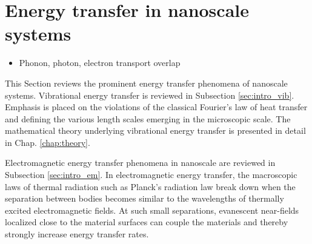 




\section{Energy transfer in nanoscale systems}
\begin{itemize}
 \item Phonon, photon, electron transport overlap
\end{itemize}
This Section reviews the prominent energy transfer phenomena of nanoscale systems. Vibrational energy transfer is reviewed in Subsection \ref{sec:intro_vib}. Emphasis is placed on the violations of the classical Fourier's law of heat transfer and defining the various length scales emerging in the microscopic scale. The mathematical theory underlying vibrational energy transfer is presented in detail in Chap. \ref{chap:theory}. 


Electromagnetic energy transfer phenomena in nanoscale are reviewed in Subsection \ref{sec:intro_em}. In electromagnetic energy transfer, the macroscopic laws of thermal radiation such as Planck's radiation law break down when the separation between bodies becomes similar to the wavelengths of thermally excited electromagnetic fields. At such small separations, evanescent near-fields localized close to the material surfaces can couple the materials and thereby strongly increase energy transfer rates. %

